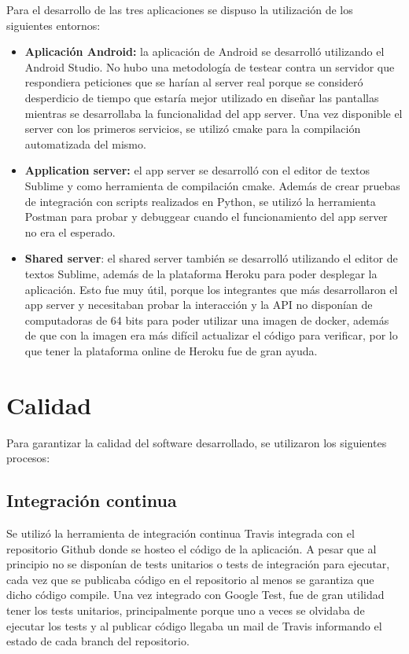 \documentclass[letterpaper,10pt,spanish]{sphinxmanual}
\begin{document}
Para el desarrollo de las tres aplicaciones se dispuso la utilización de los siguientes entornos:
\begin{itemize}
\item {} 
\textbf{Aplicación Android:} la aplicación de Android se desarrolló utilizando el Android Studio. No hubo una metodología de testear contra un servidor que respondiera peticiones que se harían al server real porque se consideró desperdicio de tiempo que estaría mejor utilizado en diseñar las pantallas mientras se desarrollaba la funcionalidad del app server. Una vez disponible el server con los primeros servicios, se utilizó cmake para la compilación automatizada del mismo.

\item {} 
\textbf{Application server:} el app server se desarrolló con el editor de textos Sublime y como herramienta de compilación cmake. Además de crear pruebas de integración con scripts realizados en Python, se utilizó la herramienta Postman para probar y debuggear cuando el funcionamiento del app server no era el esperado.

\item {} 
\textbf{Shared server}: el shared server también se desarrolló utilizando el editor de textos Sublime, además de la plataforma Heroku para poder desplegar la aplicación. Esto fue muy útil, porque los integrantes que más desarrollaron el app server y necesitaban probar la interacción y la API no disponían de computadoras de 64 bits para poder utilizar una imagen de docker, además de que con la imagen era más difícil actualizar el código para verificar, por lo que tener la plataforma online de Heroku fue de gran ayuda.

\end{itemize}


\chapter{Calidad}
\label{manual:calidad}
Para garantizar la calidad del software desarrollado, se utilizaron los siguientes procesos:


\section{Integración continua}
\label{manual:integracion-continua}
Se utilizó la herramienta de integración continua Travis integrada con el repositorio Github donde se hosteo el código de la aplicación. A pesar que al principio no se disponían de tests unitarios o tests de integración para ejecutar, cada vez que se publicaba código en el repositorio al menos se garantiza que dicho código compile. Una vez integrado con Google Test, fue de gran utilidad tener los tests unitarios, principalmente porque uno a veces se olvidaba de ejecutar los tests y al publicar código llegaba un mail de Travis informando el estado de cada branch del repositorio.
\end{document}
